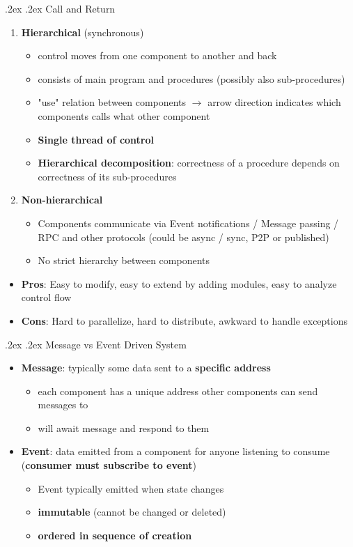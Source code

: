 \documentclass[10pt,landscape,a4paper]{article}
\makeatletter
\renewcommand{\subsection}{\@startsection{subsection}{1}{0mm}%
	{.2ex}%
	{.2ex}%
	{\sffamily\bfseries}}
\renewcommand{\subsubsection}{\@startsection{subsubsection}{1}{0mm}%
	{.2ex}%
	{.2ex}%
	{\rmfamily\bfseries}}
\makeatother
\begin{document}
\begin{multicols*}{4}
		\subsection{Call and Return}
		\begin{enumerate}
			\item \textbf{Hierarchical} (synchronous)
			\begin{itemize}
				\item control moves from one component to another and back
				\item consists of main program and procedures (possibly also sub-procedures)
				\item "use" relation between components $\rightarrow$ arrow direction indicates which components calls what other component
				\item \textbf{Single thread of control}
				\item \textbf{Hierarchical decomposition}: correctness of a procedure depends on
				correctness of its sub-procedures
			\end{itemize}
			\item \textbf{Non-hierarchical}
			\begin{itemize}
				\item Components communicate via Event notifications / Message passing / RPC and other protocols (could be async / sync, P2P or published)
				\item No strict hierarchy between components
			\end{itemize}
		\end{enumerate}
		\begin{itemize}
			\item \textbf{Pros}: Easy to modify, easy to extend by adding modules, easy to analyze control flow
			\item \textbf{Cons}: Hard to parallelize, hard to distribute, awkward to handle exceptions
		\end{itemize}
		\subsubsection{Message vs Event Driven System}
		\begin{itemize}
			\item \textbf{Message}: typically some data sent to a \textbf{specific address}
			\begin{itemize}
				\item each component has a unique address other components can send messages to
				\item will await message and respond to them
			\end{itemize}
			\item \textbf{Event}: data emitted from a component for anyone listening to consume (\textbf{consumer must subscribe to event})
			\begin{itemize}
				\item Event typically emitted when state changes
				\item \textbf{immutable} (cannot be changed or deleted)
				\item \textbf{ordered in sequence of creation}
			\end{itemize}
		\end{itemize}

\end{multicols*}
\end{document}
